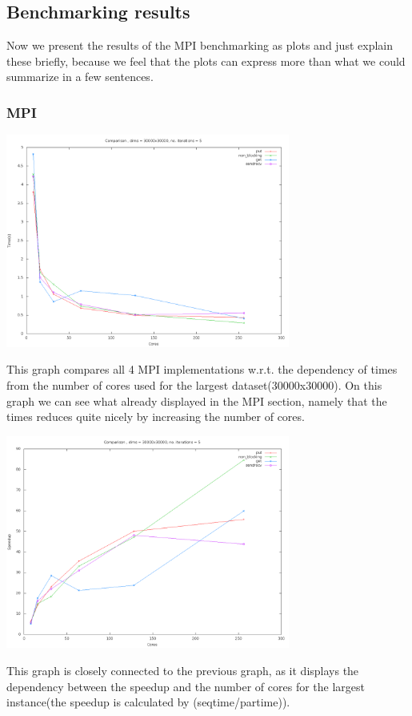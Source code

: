 \documentclass[11pt]{article}
\begin{document}
\subsection{Benchmarking results}
Now we present the results of the MPI benchmarking as plots and just explain these briefly, because we feel that the plots can express more than what we could summarize in a few sentences.
\subsubsection {MPI}
\begin{center}
\includegraphics[width=0.7\textwidth]{cmpcxt.png}
\end{center}
This graph compares all 4 MPI implementations w.r.t. the dependency of times from the number of cores used for the largest dataset(30000x30000).
On this graph we can see what already displayed in the MPI section, namely that the times reduces quite nicely by increasing the number of cores.
\begin{center}
\includegraphics[width=0.7\textwidth]{cmpsxc.png}
\end{center}
This graph is closely connected to the previous graph, as it displays the dependency between the speedup and the number of cores for the largest instance(the speedup is calculated by (seqtime/partime)).
\end{document}
